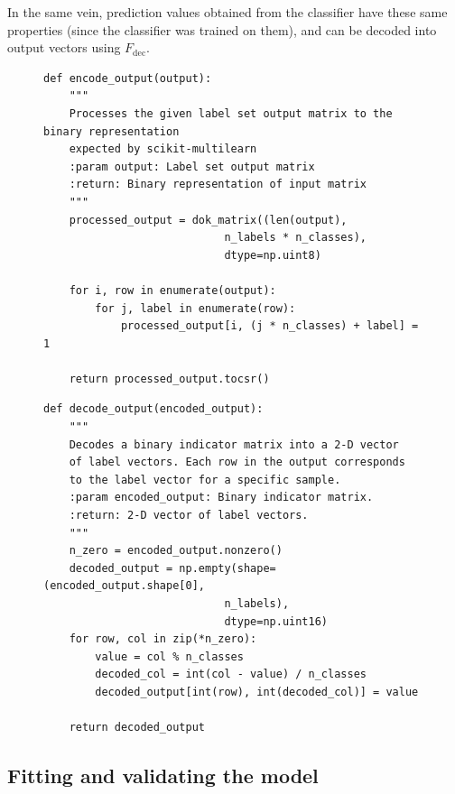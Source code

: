 \documentclass{kthreport}
\theoremstyle{definition}
\begin{document}
In the same vein, prediction values obtained from the classifier have these same properties (since the classifier was trained on them), and can be decoded into output vectors using $F_{\text{dec}}$.

\begin{figure}[tb]
	\begin{lstlisting}[style=MyPython, caption={Encoding function in Python. This function both transforms the given output label matrix using $F_{\text{enc}}$ and encodes the result into a binary indicator matrix.}]
def encode_output(output):
	"""
	Processes the given label set output matrix to the binary representation
	expected by scikit-multilearn
	:param output: Label set output matrix
	:return: Binary representation of input matrix
	"""
	processed_output = dok_matrix((len(output), 
							n_labels * n_classes), 
							dtype=np.uint8)
	
	for i, row in enumerate(output):
		for j, label in enumerate(row):
			processed_output[i, (j * n_classes) + label] = 1
	
	return processed_output.tocsr()
		\end{lstlisting}
\end{figure}

\begin{figure}[tb]
	\begin{lstlisting}[style=MyPython, caption={Decoding function in Python, which takes a binary indicator matrix and extracts and decodes the encoded values within using $F_{\text{dec}}$.}, label={lst:decode}]
def decode_output(encoded_output):
	"""
	Decodes a binary indicator matrix into a 2-D vector 
	of label vectors. Each row in the output corresponds 
	to the label vector for a specific sample.
	:param encoded_output: Binary indicator matrix.
	:return: 2-D vector of label vectors.
	"""
	n_zero = encoded_output.nonzero()
	decoded_output = np.empty(shape=(encoded_output.shape[0],
							n_labels),
							dtype=np.uint16)
	for row, col in zip(*n_zero):
		value = col % n_classes
		decoded_col = int(col - value) / n_classes
		decoded_output[int(row), int(decoded_col)] = value
	
	return decoded_output
	\end{lstlisting}
\end{figure}

\subsection{Fitting and validating the model}
\end{document}

